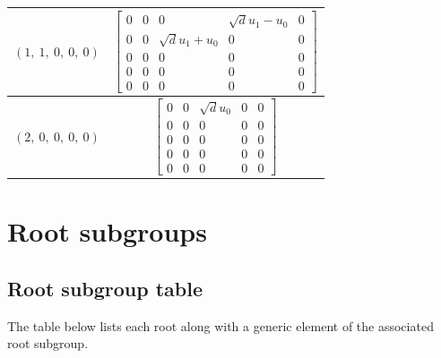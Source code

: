 \documentclass[11pt]{article}
\newcommand{\noi}{\noindent}
\theoremstyle{definition}
\begin{document}
\begin{tabular}{|l|c|}
    \hline
    $\left( 1, \  1, \  0, \  0, \  0\right)$ & $\left[\begin{matrix}0 & 0 & 0 & \sqrt{d} u_{1} - u_{0} & 0\\0 & 0 & \sqrt{d} u_{1} + u_{0} & 0 & 0\\0 & 0 & 0 & 0 & 0\\0 & 0 & 0 & 0 & 0\\0 & 0 & 0 & 0 & 0\end{matrix}\right]$ \\
    \hline
    $\left( 2, \  0, \  0, \  0, \  0\right)$ & $\left[\begin{matrix}0 & 0 & \sqrt{d} u_{0} & 0 & 0\\0 & 0 & 0 & 0 & 0\\0 & 0 & 0 & 0 & 0\\0 & 0 & 0 & 0 & 0\\0 & 0 & 0 & 0 & 0\end{matrix}\right]$ \\
    \hline
\end{tabular}


\newpage
\section{Root subgroups}

\subsection{Root subgroup table}

\noi The table below lists each root along with a generic element of the associated root subgroup.

\bigskip
\end{document}
